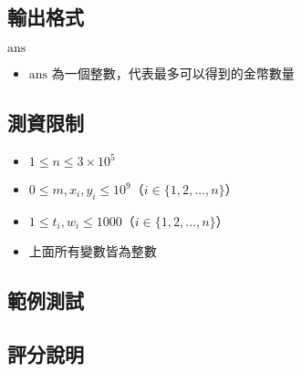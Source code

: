 \subsection{輸出格式}

\begin{format}
\f{
$\textrm{ans}$
}
\end{format}

\begin{itemize}
\tightlist
\item
  \begin{math}\textrm{ans}\end{math}
  為一個整數，代表最多可以得到的金幣數量
\end{itemize}

\subsection{測資限制}

\begin{itemize}
\tightlist
\item
  \begin{math}1 \le n \le 3 \times 10^5\end{math}
\item
  \begin{math}0 \le m, x_i, y_i \le 10^9\end{math}（\begin{math}i \in \{1, 2, \ldots, n\}\end{math}）
\item
  \begin{math}1 \le t_i, w_i \le 1000\end{math}（\begin{math}i \in \{1, 2, \ldots, n\}\end{math}）
\item
  上面所有變數皆為整數
\end{itemize}

\subsection{範例測試}

\begin{example}
%
%
%
\end{example}

\subsection{評分說明}

